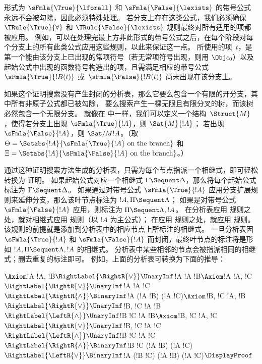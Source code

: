 \documentclass[../../../include/open-logic-section]{subfiles}
\begin{document}
形式为 $\sFmla{\True}{\lforall}$ 和 $\sFmla{\False}{\lexists}$ 的带号公式永远不会被勾除，因此必须特殊处理。
若分支上存在这类公式，我们必须确保 $\TRule{\True}{\forall}$ 和 $\TRule{\False}{\lexists}$ 规则最终对所有适用的项都被应用。
例如，可以在处理完最上方非此形式的带号公式之后，在每个阶段对每个分支上的所有此类公式应用这些规则，以此来保证这一点。
所使用的项~$t$，是第一个能由该分支上已出现的常项符号（若无常项符号出现，则用 $\Obj c_0$）以及起始公式中出现的函数符号构造出的项，且需满足相应的带号公式 $\sFmla{\True}{!B(t)}$ 或~$\sFmla{\False}{!B(t)}$ 尚未出现在该分支上。

如果这个证明搜索没有产生封闭的分析表，那么它要么包含一个有限的开分支，其中所有非原子公式都已被勾除，
要么搜索产生一棵无限且有限分叉的树，而该树必然包含一个无限分支。
就像在  中一样，我们可以定义一个结构~$\Struct{M}$，使得若分支上出现 $\sFmla{\True}{!A}$，则 $\Sat{M}{!A}$；
若出现 $\sFmla{\False}{!A}$，则 $\Sat/{M}{!A}$。（取 $\Theta =
\Setabs{!A}{\sFmla{\True}{!A} \text{ on the branch}}$ 和 $\Xi =
\Setabs{!A}{\sFmla{\False}{!A} \text{ on the branch}}$。）

通过这种证明搜索方法生成的分析表，只需为每个节点指派一个相继式，即可轻松转换为  证明。
如果起始公式对应一个相继式 $\Gamma \Sequent \Delta$，那么将每个起始公式标注为 $\Gamma \Sequent \Delta$。
如果通过对带号公式 $\sFmla{\True}{!A}$ 应用分支扩展规则来延伸分支，那么该叶节点标注为 $!A, \Pi \Sequent \Lambda$；
如果是对带号公式 $\sFmla{\False}{!A}$ 应用，则标注为 $\Pi \Sequent \Lambda, !A$。
在分析表应用 \TRule{\True}{\star} 规则之处，就对相继式应用 \LeftR{\star} 规则（以 $!A$ 为主公式）；
在应用 \TRule{\False}{\star} 规则之处，就应用 \RightR{\star} 规则。
该规则的前提就是添加到分析表中的相应节点上所标注的相继式。
一旦分析表因 $\sFmla{\True}{!A}$ 和 $\sFmla{\False}{!A}$ 而封闭，最终叶节点的标注将是形如 $!A, \Pi \Sequent \Lambda, !A$ 的相继式。
分析表中某些相邻的节点会被指派相同的相继式；删去重复的标注即可。
例如，上面的分析表可转换为下面的推导：

\begin{maxwidth}
$
\Axiom$!A \fCenter !A, !B$
\RightLabel{\RightR{\lor}}
\UnaryInf$!A \fCenter !A \lor !B$
\Axiom$!A \fCenter !A, !C$
\RightLabel{\RightR{\lor}}
\UnaryInf$!A \fCenter !A \lor !C$
\RightLabel{\RightR{\land}}
\BinaryInf$!A \fCenter (!A \lor !B) \land (!A \lor !C)$
\Axiom$!B, !C \fCenter !A, !B$
\RightLabel{\RightR{\lor}}
\UnaryInf$!B, !C \fCenter !A \lor !B$
\RightLabel{\LeftR{\land}}
\UnaryInf$!B \land !C \fCenter !A \lor !B$
\Axiom$!B, !C \fCenter !A, !C$
\RightLabel{\RightR{\lor}}
\UnaryInf$!B, !C \fCenter !A \lor !C$
\RightLabel{\LeftR{\land}}
\UnaryInf$!B \land !C \fCenter !A \lor !C$
\RightLabel{\RightR{\land}}
\BinaryInf$!B \land !C \fCenter (!A \lor !B) \land
(!A \lor !C)$
\RightLabel{\LeftR{\lor}}
\BinaryInf$!A \lor (!B \land !C) \fCenter (!A \lor !B) \land
(!A \lor !C)$
\DisplayProof$
\end{maxwidth}
\end{document}
